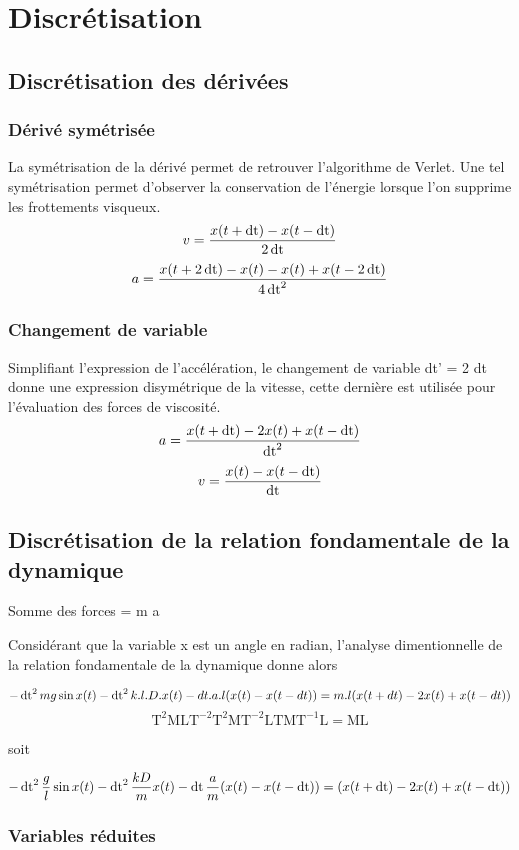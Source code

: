 
\section{Discrétisation}

\subsection{Discrétisation des dérivées}
%
\subsubsection{Dérivé symétrisée}
La symétrisation de la dérivé permet de retrouver l'algorithme de Verlet. Une tel symétrisation permet d'observer la conservation de l'énergie lorsque l'on supprime les frottements visqueux.
\[
v=\frac{x(t+\operatorname{dt})-x(t-\operatorname{dt})}{2\operatorname{dt}}
\]
\[
a=\frac{x(t+2\operatorname{dt})-x(t)-x(t)+x(t-2\operatorname{dt})}{4\operatorname{dt}^2}
\]
%
\subsubsection{Changement de variable}
Simplifiant l'expression de l'accélération, le changement de variable dt' = 2 dt donne une expression disymétrique de la vitesse, cette dernière est utilisée pour l'évaluation des forces de viscosité.
\[
a=\frac{x(t+\operatorname{dt})-2x(t)+x(t-\operatorname{dt})}{\operatorname{dt}^2}
\]
\[
v=\frac{x(t)-x(t-\operatorname{dt})}{\operatorname{dt}}
\]

\subsection{Discrétisation de la relation fondamentale de la dynamique}

Somme des forces = m a

Considérant que la variable x est un angle en radian, l'analyse dimentionnelle de la relation fondamentale de la dynamique donne alors

\[
-\operatorname{dt}^2mg\sin{x(t)}  -  \operatorname{dt}^2 k.l.D.x(t)  -  dt.a.l ( x(t) - x(t-dt) )  =  m.l ( x(t+dt) - 2x(t) + x(t-dt) )
\]
\[
\mathrm{
 T^2MLT^{-2}         T^2MT^{-2}L        TMT^{-1}L       =       ML
}
\]

soit

\[
- \operatorname{dt}^2\frac{g}{l}\sin{x(t)}-\operatorname{dt}^2\frac{kD}{m} x(t) - \operatorname{dt}\frac{a}{m}(x(t)-x(t-\operatorname{dt}))=(x(t+\operatorname{dt})-2x(t)+x(t-\operatorname{dt}))
\]
\subsubsection{Variables réduites}


